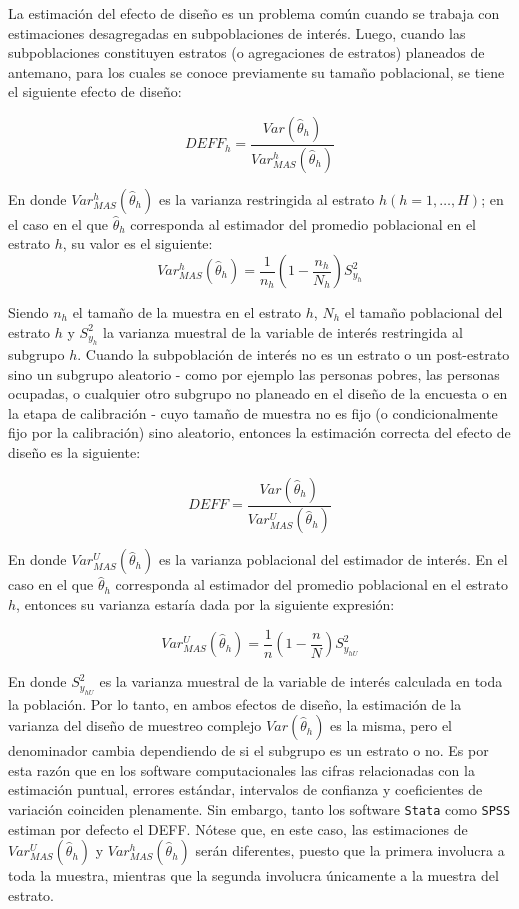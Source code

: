 \documentclass[
  10pt,
  spanish,
]{book}
\begin{document}
La estimación del efecto de diseño es un problema común cuando se trabaja con estimaciones desagregadas en subpoblaciones de interés. Luego, cuando las subpoblaciones constituyen estratos (o agregaciones de estratos) planeados de antemano, para los cuales se conoce previamente su tamaño poblacional, se tiene el siguiente efecto de diseño:

\[
DEFF_h= \frac{Var (\hat\theta_h) }{Var_{MAS}^h(\hat\theta_h) }
\]

En donde \(Var_{MAS}^h(\hat\theta_h)\) es la varianza restringida al estrato \(h (h=1,\ldots, H)\); en el caso en el que \(\hat\theta_h\) corresponda al estimador del promedio poblacional en el estrato \(h\), su valor es el siguiente:
\[
Var_{MAS}^h(\hat\theta_h)=\frac{1}{n_h}\left(1-\frac{n_h}{N_h}\right)S_{y_h}^2
\]

Siendo \(n_h\) el tamaño de la muestra en el estrato \(h\), \(N_h\) el tamaño poblacional del estrato \(h\) y \(S_{y_h}^2\) la varianza muestral de la variable de interés restringida al subgrupo \(h\). Cuando la subpoblación de interés no es un estrato o un post-estrato sino un subgrupo aleatorio - como por ejemplo las personas pobres, las personas ocupadas, o cualquier otro subgrupo no planeado en el diseño de la encuesta o en la etapa de calibración - cuyo tamaño de muestra no es fijo (o condicionalmente fijo por la calibración) sino aleatorio, entonces la estimación correcta del efecto de diseño es la siguiente:

\[
DEFF= \frac{Var (\hat\theta_h) }{Var_{MAS}^U(\hat\theta_h) }
\]

En donde \(Var_{MAS}^U(\hat\theta_h)\) es la varianza poblacional del estimador de interés. En el caso en el que \(\hat\theta_h\) corresponda al estimador del promedio poblacional en el estrato \(h\), entonces su varianza estaría dada por la siguiente expresión:

\[
Var_{MAS}^U(\hat\theta_h)=\frac{1}{n}\left(1-\frac{n}{N}\right)S_{y_{hU}}^2
\]

En donde \(S_{y_{hU}}^2\) es la varianza muestral de la variable de interés calculada en toda la población. Por lo tanto, en ambos efectos de diseño, la estimación de la varianza del diseño de muestreo complejo \(Var (\hat\theta_h)\) es la misma, pero el denominador cambia dependiendo de si el subgrupo es un estrato o no. Es por esta razón que en los software computacionales las cifras relacionadas con la estimación puntual, errores estándar, intervalos de confianza y coeficientes de variación coinciden plenamente. Sin embargo, tanto los software \texttt{Stata} como \texttt{SPSS} estiman por defecto el DEFF. Nótese que, en este caso, las estimaciones de \(Var_{MAS}^U(\hat\theta_h)\) y \(Var_{MAS}^h(\hat\theta_h)\) serán diferentes, puesto que la primera involucra a toda la muestra, mientras que la segunda involucra únicamente a la muestra del estrato.
\end{document}
